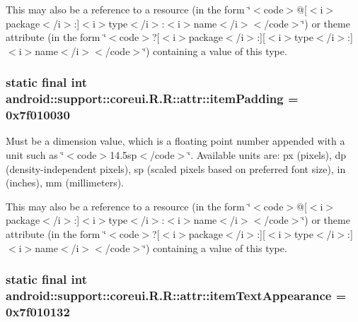 This may also be a reference to a resource (in the form \char`\"{}$<$code$>$@\mbox{[}$<$i$>$package$<$/i$>$:\mbox{]}$<$i$>$type$<$/i$>$:$<$i$>$name$<$/i$>$$<$/code$>$\char`\"{}) or theme attribute (in the form \char`\"{}$<$code$>$?\mbox{[}$<$i$>$package$<$/i$>$:\mbox{]}\mbox{[}$<$i$>$type$<$/i$>$:\mbox{]}$<$i$>$name$<$/i$>$$<$/code$>$\char`\"{}) containing a value of this type. \hypertarget{classandroid_1_1support_1_1coreui_1_1_r_1_1attr_64e012aee5db46b5517cfc03d5c9d1eb}{
\subsubsection[{itemPadding}]{\setlength{\rightskip}{0pt plus 5cm}static final int android::support::coreui.R.R::attr::itemPadding = 0x7f010030}}
\label{classandroid_1_1support_1_1coreui_1_1_r_1_1attr_64e012aee5db46b5517cfc03d5c9d1eb}


Must be a dimension value, which is a floating point number appended with a unit such as \char`\"{}$<$code$>$14.5sp$<$/code$>$\char`\"{}. Available units are: px (pixels), dp (density-independent pixels), sp (scaled pixels based on preferred font size), in (inches), mm (millimeters). 

This may also be a reference to a resource (in the form \char`\"{}$<$code$>$@\mbox{[}$<$i$>$package$<$/i$>$:\mbox{]}$<$i$>$type$<$/i$>$:$<$i$>$name$<$/i$>$$<$/code$>$\char`\"{}) or theme attribute (in the form \char`\"{}$<$code$>$?\mbox{[}$<$i$>$package$<$/i$>$:\mbox{]}\mbox{[}$<$i$>$type$<$/i$>$:\mbox{]}$<$i$>$name$<$/i$>$$<$/code$>$\char`\"{}) containing a value of this type. \hypertarget{classandroid_1_1support_1_1coreui_1_1_r_1_1attr_a231f0ae38b0a924330860f1e4cb130a}{
\subsubsection[{itemTextAppearance}]{\setlength{\rightskip}{0pt plus 5cm}static final int android::support::coreui.R.R::attr::itemTextAppearance = 0x7f010132}}
\label{classandroid_1_1support_1_1coreui_1_1_r_1_1attr_a231f0ae38b0a924330860f1e4cb130a}


